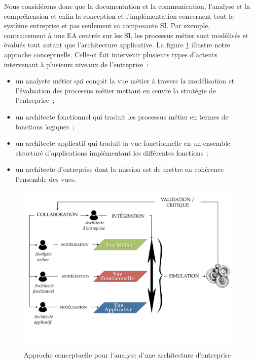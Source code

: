 Nous considérons donc que la documentation et la communication, l'analyse et la
compréhension et enfin la conception et l'implémentation concernent tout le système entreprise et
pas seulement sa composante SI. Par exemple, contrairement à une EA centrée sur
les SI, les processus métier sont modélisés et évalués tout autant que
l'architecture applicative. La figure \ref{fig:approche_conceptuelle} illustre
notre approche conceptuelle. Celle-ci fait intervenir plusieurs types d'acteurs
intervenant à plusieurs niveaux de l'entreprise~: \begin{itemize} \item un
analyste métier qui conçoit la vue métier à travers la modélisation et
l'évaluation des processus métier mettant en œuvre la stratégie de
l'entreprise~; \item un architecte fonctionnel qui traduit les processus métier
en termes de fonctions logiques~; \item un architecte applicatif qui traduit la
vue fonctionnelle en un ensemble structuré d'applications implémentant les
différentes fonctions~; \item un architecte d'entreprise dont la mission est de
mettre en cohérence l'ensemble des vues. \end{itemize}

\begin{figure}[!ht]
 \begin{center}
 \includegraphics[trim= 0cm 3.5cm 0cm 0cm, width=1\textwidth]{figures/4_demarche/approche_conceptuelle.pdf} \end{center}
 \caption{Approche conceptuelle pour l'analyse d'une architecture d'entreprise}
 \label{fig:approche_conceptuelle}
\end{figure}

